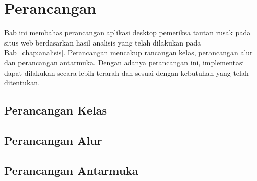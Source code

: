 \chapter{Perancangan}
\label{chap:perancangan}

Bab ini membahas perancangan aplikasi desktop pemeriksa tautan rusak pada situs web berdasarkan hasil analisis yang telah dilakukan pada Bab~\ref{chap:analisis}. Perancangan mencakup rancangan kelas, perancangan alur dan perancangan antarmuka. Dengan adanya perancangan ini, implementasi dapat dilakukan secara lebih terarah dan sesuai dengan kebutuhan yang telah ditentukan.


\section{Perancangan Kelas}
\label{sec:04-perancangan-kelas}



\section{Perancangan Alur}
\label{sec:04-perancangan-alur}



\section{Perancangan Antarmuka}
\label{sec:04-perancangan-antarmuka}

